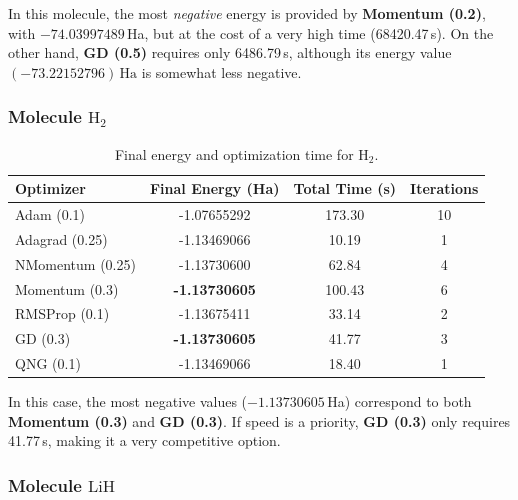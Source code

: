 In this molecule, the most \emph{negative} energy is provided by \textbf{Momentum (0.2)}, with \(-74.03997489\)\,Ha, but at the cost of a very high time (68420.47\,s). On the other hand, \textbf{GD (0.5)} requires only 6486.79\,s, although its energy value \((-73.22152796)\,\mathrm{Ha}\) is somewhat less negative.

\subsubsection{Molecule \(\mathrm{H_2}\)}

\begin{table}[h!]
\centering
\caption{Final energy and optimization time for \(\mathrm{H_2}\).}
\begin{tabular}{lccc}
\toprule
\textbf{Optimizer} & \textbf{Final Energy (Ha)} & \textbf{Total Time (s)} & \textbf{Iterations} \\
\midrule
Adam (0.1)       & -1.07655292  & 173.30  & 10 \\
Adagrad (0.25)   & -1.13469066  & 10.19   &  1 \\
NMomentum (0.25) & -1.13730600  & 62.84   &  4 \\
Momentum (0.3)   & \textbf{-1.13730605} & 100.43  &  6 \\
RMSProp (0.1)    & -1.13675411  & 33.14   &  2 \\
GD (0.3)         & \textbf{-1.13730605} & 41.77   &  3 \\
QNG (0.1)        & -1.13469066  & 18.40   &  1 \\
\bottomrule
\end{tabular}
\end{table}

In this case, the most negative values (\(-1.13730605\)\,Ha) correspond to both \textbf{Momentum (0.3)} and \textbf{GD (0.3)}. If speed is a priority, \textbf{GD (0.3)} only requires 41.77\,s, making it a very competitive option.

\subsubsection{Molecule \(\mathrm{LiH}\)}

